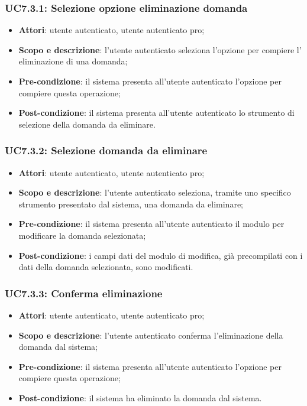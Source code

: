 	\subsubsection{UC7.3.1: Selezione opzione eliminazione domanda}
	\begin{itemize}
		\item
			\textbf{Attori}: utente autenticato, utente autenticato pro;
		\item
			\textbf{Scopo e descrizione}: l'utente autenticato seleziona l'opzione per compiere l' eliminazione di una domanda;
		\item		
			\textbf{Pre-condizione}: il sistema presenta all'utente autenticato l'opzione per compiere questa operazione;
		\item
			\textbf{Post-condizione}: il sistema presenta all'utente autenticato lo strumento di selezione della domanda da eliminare.
	\end{itemize}
	\subsubsection{UC7.3.2: Selezione domanda da eliminare}
	\begin{itemize}
		\item
			\textbf{Attori}: utente autenticato, utente autenticato pro;
		\item
			\textbf{Scopo e descrizione}: l'utente autenticato seleziona, tramite uno specifico strumento presentato dal sistema, una domanda da eliminare;
		\item		
			\textbf{Pre-condizione}: il sistema presenta all'utente autenticato il modulo per modificare la domanda selezionata;
		\item
			\textbf{Post-condizione}: i campi dati del modulo di modifica, già precompilati con i dati della domanda selezionata, sono modificati.
	\end{itemize}		
	\subsubsection{UC7.3.3: Conferma eliminazione}
	\begin{itemize}
		\item
			\textbf{Attori}: utente autenticato, utente autenticato pro;
		\item
			\textbf{Scopo e descrizione}: l'utente autenticato conferma l'eliminazione della domanda dal sistema;
		\item		
			\textbf{Pre-condizione}: il sistema presenta all'utente autenticato l'opzione per compiere questa operazione;
		\item
			\textbf{Post-condizione}: il sistema ha eliminato la domanda dal sistema.
	\end{itemize}	